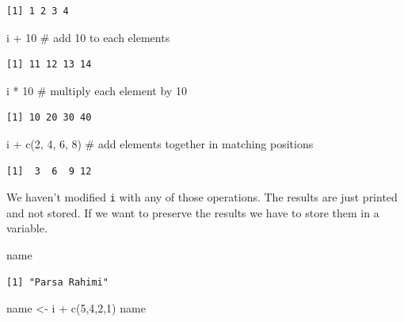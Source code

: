 \documentclass[
  letterpaper,
]{book}
\newenvironment{Shaded}{\begin{snugshade}}{\end{snugshade}}
\newcommand{\CommentTok}[1]{\textcolor[rgb]{0.37,0.37,0.37}{#1}}
\newcommand{\DecValTok}[1]{\textcolor[rgb]{0.68,0.00,0.00}{#1}}
\newcommand{\FunctionTok}[1]{\textcolor[rgb]{0.28,0.35,0.67}{#1}}
\newcommand{\NormalTok}[1]{\textcolor[rgb]{0.00,0.23,0.31}{#1}}
\newcommand{\OtherTok}[1]{\textcolor[rgb]{0.00,0.23,0.31}{#1}}
\newcommand{\SpecialCharTok}[1]{\textcolor[rgb]{0.37,0.37,0.37}{#1}}
\begin{document}
\begin{verbatim}
[1] 1 2 3 4
\end{verbatim}

\begin{Shaded}
\begin{Highlighting}[]
\NormalTok{i }\SpecialCharTok{+} \DecValTok{10} \CommentTok{\# add 10 to each elements}
\end{Highlighting}
\end{Shaded}

\begin{verbatim}
[1] 11 12 13 14
\end{verbatim}

\begin{Shaded}
\begin{Highlighting}[]
\NormalTok{i }\SpecialCharTok{*} \DecValTok{10} \CommentTok{\# multiply each element by 10}
\end{Highlighting}
\end{Shaded}

\begin{verbatim}
[1] 10 20 30 40
\end{verbatim}

\begin{Shaded}
\begin{Highlighting}[]
\NormalTok{i }\SpecialCharTok{+} \FunctionTok{c}\NormalTok{(}\DecValTok{2}\NormalTok{, }\DecValTok{4}\NormalTok{, }\DecValTok{6}\NormalTok{, }\DecValTok{8}\NormalTok{) }\CommentTok{\# add elements together in matching positions}
\end{Highlighting}
\end{Shaded}

\begin{verbatim}
[1]  3  6  9 12
\end{verbatim}

We haven't modified \texttt{i} with any of those operations. The results
are just printed and not stored. If we want to preserve the results we
have to store them in a variable.

\begin{Shaded}
\begin{Highlighting}[]
\NormalTok{name}
\end{Highlighting}
\end{Shaded}

\begin{verbatim}
[1] "Parsa Rahimi"
\end{verbatim}

\begin{Shaded}
\begin{Highlighting}[]
\NormalTok{name }\OtherTok{\textless{}{-}}\NormalTok{ i }\SpecialCharTok{+} \FunctionTok{c}\NormalTok{(}\DecValTok{5}\NormalTok{,}\DecValTok{4}\NormalTok{,}\DecValTok{2}\NormalTok{,}\DecValTok{1}\NormalTok{)}
\NormalTok{name}
\end{Highlighting}
\end{Shaded}
\end{document}
